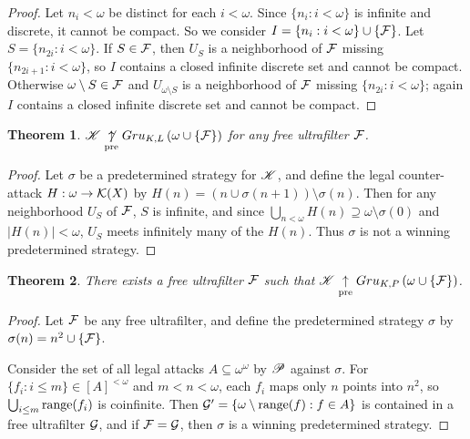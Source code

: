 \documentclass{amsart}
\newtheorem{theorem}{Theorem}[section]
\theoremstyle{definition}
\begin{document}
\begin{proof}
  Let \(n_i<\omega\) be distinct for each \(i<\omega\).
  Since \(\{n_i:i<\omega\}\) is infinite and discrete, it
  cannot be compact.
  So we consider \(I=\{n_i:i<\omega\}\cup\{\mathcal{F}\}\).
  Let \(S=\{n_{2i}:i<\omega\}\). If \(S\in \mathcal{F}\), then \(U_S\) is a
  neighborhood of \(\mathcal{F}\) missing \(\{n_{2i+1}:i<\omega\}\), so \(I\)
  contains a closed infinite discrete set and cannot be compact.
  Otherwise \(\omega\setminus S\in \mathcal{F}\) and \(U_{\omega\setminus S}\)
  is a neighborhood of \(\mathcal{F}\) missing \(\{n_{2i}:i<\omega\}\); again
  \(I\) contains a closed infinite discrete set and cannot be compact.
\end{proof}

\begin{theorem}
  \(\mathscr{K}\underset{\text{pre}}{\not\uparrow} Gru_{K,L}\left({\omega\cup\{\mathcal{F}\}}\right)\) for any free
  ultrafilter \(\mathcal{F}\).
\end{theorem}

\begin{proof}
  Let \(\sigma\) be a predetermined strategy for \(\mathscr{K}\), and define the legal
  counter-attack \(H:\omega\to\mathcal{K}(X)\) by
  \(H(n)=(n\cup\sigma(n+1))\setminus\sigma(n)\). Then for any neighborhood
  \(U_S\) of \(\mathcal{F}\), \(S\) is infinite, and since
  \(\bigcup_{n<\omega} H(n)\supseteq\omega\setminus\sigma(0)\)
  and \(|H(n)|<\omega\), \(U_S\) meets
  infinitely many of the \(H(n)\). Thus \(\sigma\) is not a winning
  predetermined strategy.
\end{proof}

\begin{theorem}
  There exists a free ultrafilter \(\mathcal{F}\) such that
  \(\mathscr{K}\underset{\text{pre}}{\uparrow} Gru_{K,P}\left({\omega\cup\{\mathcal{F}\}}\right)\).
\end{theorem}

\begin{proof}
  Let \(\mathcal{F}\) be any free ultrafilter, and
  define the predetermined strategy \(\sigma\) by
  \(\sigma(n)=n^2\cup\{\mathcal{F}\}\).

  Consider the set of all legal attacks \(A\subseteq\omega^\omega\) by
  \(\mathscr{P}\) against \(\sigma\). For \(\{f_i:i\leq m\}\in [A]^{<\omega}\) and
  \(m<n<\omega\), each \(f_i\) maps only \(n\) points into \(n^2\), so
  \(\bigcup_{i\leq m}\text{range}(f_i)\) is coinfinite.
  Then \(\mathcal{G}'=\{\omega\setminus\text{range}(f) : f\in A\}\) is contained in a free
  ultrafilter \(\mathcal{G}\), and if \(\mathcal{F}=\mathcal{G}\), then \(\sigma\) is a
  winning predetermined strategy.
\end{proof}
\end{document}
